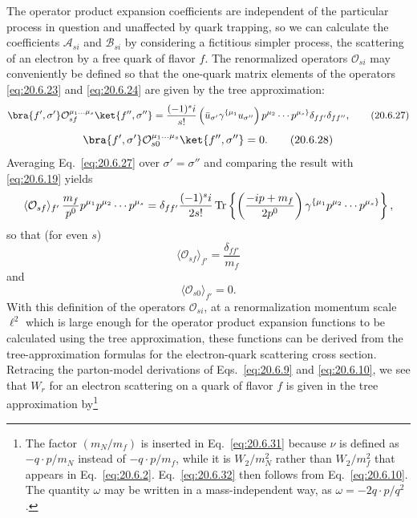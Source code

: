 The operator product expansion coefficients are independent of the particular process in question and unaffected by quark trapping, so we can calculate the coefficients $\mathcal A_{si}$ and $\mathcal B_{si}$ by considering a fictitious simpler process, the scattering of an electron by a free quark of flavor $f$. The renormalized operators $\mathcal O_{si}$ may conveniently be defined so that the one-quark matrix elements of the operators \eqref{eq:20.6.23} and \eqref{eq:20.6.24} are given by the tree approximation:
\begin{equation}
\bra{f',\sigma'}\mathcal O_{sf}^{\mu_1\ldots\mu_s}
\ket{f'',\sigma''}
=
\frac{(-1)^si}{s!}
\left(\bar u_{\sigma'}\gamma^{\{\mu_1}u_{\sigma''}\right)
p^{\mu_2}\cdots p^{\mu_s\}}
\delta_{ff'}\delta_{ff''},
\tag{20.6.27}\label{eq:20.6.27}
\end{equation}
\begin{equation}
\bra{f',\sigma'}\mathcal O_{s0}^{\mu_1\ldots\mu_s}
\ket{f'',\sigma''}=0.
\tag{20.6.28}\label{eq:20.6.28}
\end{equation}
Averaging Eq.~\eqref{eq:20.6.27} over $\sigma'=\sigma''$ and comparing the result with \eqref{eq:20.6.19} yields
\[
\langle\mathcal O_{sf}\rangle_{f'}\,
\frac{m_f}{p^0}p^{\mu_1}p^{\mu_2}\cdots p^{\mu_s}
=
\delta_{ff'}\frac{(-1)^si}{2s!}
\operatorname{Tr}\left\{
\left(\frac{-i\sl p+m_f}{2p^0}\right)
\gamma^{\{\mu_1}p^{\mu_2}\cdots p^{\mu_s\}}
\right\},
\]
so that (for even $s$)
\begin{equation}
\langle\mathcal O_{sf}\rangle_{f'}
=\frac{\delta_{ff'}}{m_f}
\tag{20.6.29}\label{eq:20.6.29}
\end{equation}
and
\begin{equation}
\langle\mathcal O_{s0}\rangle_{f'}=0.
\tag{20.6.30}\label{eq:20.6.30}
\end{equation}
With this definition of the operators $\mathcal O_{si}$, at a renormalization momentum scale $\ell^2$ which is large enough for the operator product expansion functions to be calculated using the tree approximation, these functions can be derived from the tree-approximation formulas for the electron-quark scattering cross section. Retracing the parton-model derivations of Eqs.~\eqref{eq:20.6.9} and \eqref{eq:20.6.10}, we see that $W_r$ for an electron scattering on a quark of flavor $f$ is given in the tree approximation by\footnote{The factor $(m_N/m_f)$ is inserted in Eq.~\eqref{eq:20.6.31} because $\nu$ is defined as $-q\cdot p/m_N$ instead of $-q\cdot p/m_f$, while it is $W_2/m_N^2$ rather than $W_2/m_f^2$ that appears in Eq.~\eqref{eq:20.6.2}. Eq.~\eqref{eq:20.6.32} then follows from Eq.~\eqref{eq:20.6.10}. The quantity $\omega$ may be written in a mass-independent way, as $\omega=-2q\cdot p/q^2$.}
